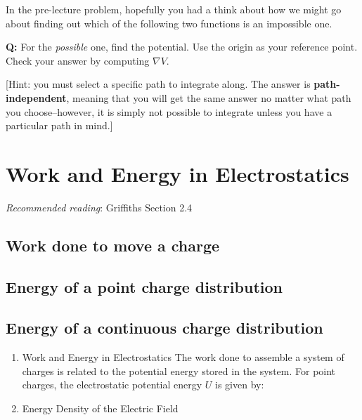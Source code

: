 \documentclass[
  letterpaper,
  DIV=11,
  numbers=noendperiod]{scrreprt}
\begin{document}
In the pre-lecture problem, hopefully you had a think about how we might
go about finding out which of the following two functions is an
impossible one.

\textbf{Q:} For the \emph{possible} one, find the potential. Use the
origin as your reference point. Check your answer by computing
\(\nabla V\).

{[}Hint: you must select a specific path to integrate along. The answer
is \textbf{path-independent}, meaning that you will get the same answer
no matter what path you choose--however, it is simply not possible to
integrate unless you have a particular path in mind.{]}


\chapter{Work and Energy in
Electrostatics}\label{work-and-energy-in-electrostatics}

\newcommand{\l}{\mathrm{\mathbf{l}}}
\newcommand{\E}{\mathrm{\mathbf{E}}}
\newcommand{\F}{\mathrm{\mathbf{F}}}
\newcommand{\r}{\mathrm{\mathbf{r}}}

\newcommand{\x}{\mathrm{\mathbf{x}}}
\newcommand{\y}{\mathrm{\mathbf{y}}}
\newcommand{\z}{\mathrm{\mathbf{z}}}

\emph{Recommended reading}: Griffiths Section 2.4

\section{Work done to move a charge}\label{work-done-to-move-a-charge}

\section{Energy of a point charge
distribution}\label{energy-of-a-point-charge-distribution}

\section{Energy of a continuous charge
distribution}\label{energy-of-a-continuous-charge-distribution}

\begin{enumerate}
\def\labelenumi{\arabic{enumi}.}
\setcounter{enumi}{9}
\item
  Work and Energy in Electrostatics The work done to assemble a system
  of charges is related to the potential energy stored in the system.
  For point charges, the electrostatic potential energy \(U\) is given
  by:
\item
  Energy Density of the Electric Field
\end{enumerate}
\end{document}
